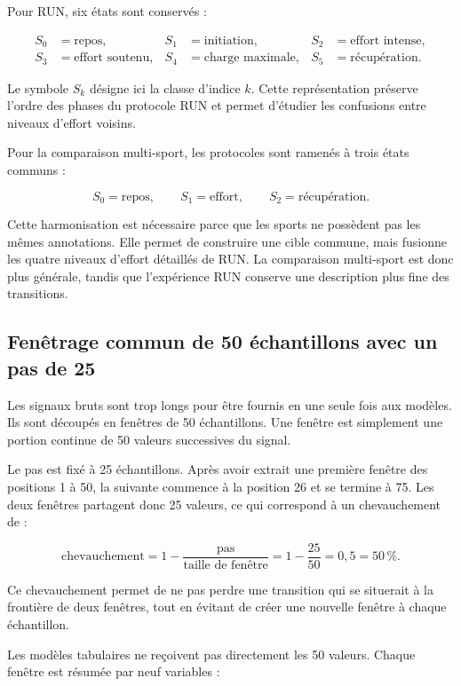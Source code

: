 \documentclass[12pt,a4paper]{article}
\begin{document}
Pour RUN, six états sont conservés :

\[
\begin{aligned}
S_0&=\text{repos}, &
S_1&=\text{initiation}, &
S_2&=\text{effort intense},\\
S_3&=\text{effort soutenu}, &
S_4&=\text{charge maximale}, &
S_5&=\text{récupération}.
\end{aligned}
\]

Le symbole $S_k$ désigne ici la classe d'indice $k$. Cette représentation
préserve l'ordre des phases du protocole RUN et permet d'étudier les
confusions entre niveaux d'effort voisins.

Pour la comparaison multi-sport, les protocoles sont ramenés à trois états
communs :

\[
S_0=\text{repos},\qquad
S_1=\text{effort},\qquad
S_2=\text{récupération}.
\]

Cette harmonisation est nécessaire parce que les sports ne possèdent pas les
mêmes annotations. Elle permet de construire une cible commune, mais fusionne
les quatre niveaux d'effort détaillés de RUN. La comparaison multi-sport est
donc plus générale, tandis que l'expérience RUN conserve une description plus
fine des transitions.

\subsection{Fenêtrage commun de 50 échantillons avec un pas de 25}

Les signaux bruts sont trop longs pour être fournis en une seule fois aux
modèles. Ils sont découpés en fenêtres de 50 échantillons. Une fenêtre est
simplement une portion continue de 50 valeurs successives du signal.

Le pas est fixé à 25 échantillons. Après avoir extrait une première fenêtre
des positions 1 à 50, la suivante commence à la position 26 et se termine à
75. Les deux fenêtres partagent donc 25 valeurs, ce qui correspond à un
chevauchement de :

\begin{equation}
\text{chevauchement}
=
1-\frac{\text{pas}}{\text{taille de fenêtre}}
=
1-\frac{25}{50}
=
0{,}5
=
50\,\%.
\end{equation}

Ce chevauchement permet de ne pas perdre une transition qui se situerait à la
frontière de deux fenêtres, tout en évitant de créer une nouvelle fenêtre à
chaque échantillon.

Les modèles tabulaires ne reçoivent pas directement les 50 valeurs. Chaque
fenêtre est résumée par neuf variables :
\end{document}

